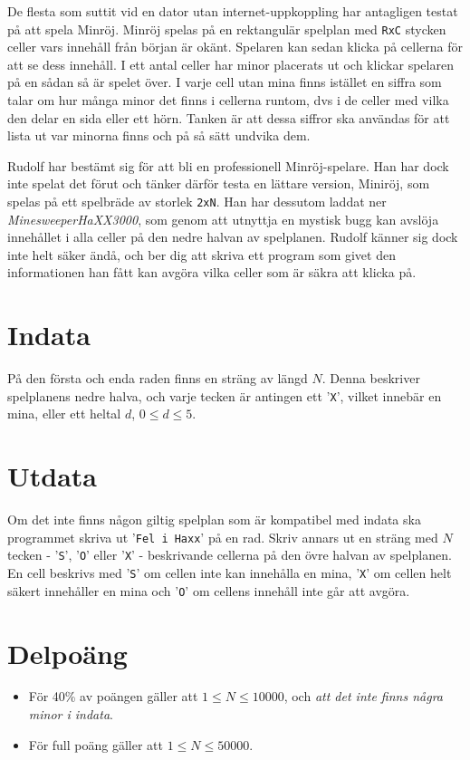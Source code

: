 De flesta som suttit vid en dator utan internet-uppkoppling har antagligen testat på att spela Minröj. Minröj spelas på en rektangulär spelplan med \texttt{RxC} stycken celler vars innehåll från början är okänt. Spelaren kan sedan klicka på cellerna för att se dess innehåll. I ett antal celler har minor placerats ut och klickar spelaren på en sådan så är spelet över. I varje cell utan mina finns istället en siffra som talar om hur många minor det finns i cellerna runtom, dvs i de celler med vilka den delar en sida eller ett hörn. Tanken är att dessa siffror ska användas för att lista ut var minorna finns och på så sätt undvika dem.

Rudolf har bestämt sig för att bli en professionell Minröj-spelare. Han har dock inte spelat det förut och tänker därför testa en lättare version, Miniröj, som spelas på ett spelbräde av storlek \texttt{2xN}. Han har dessutom laddat ner \emph{MinesweeperHaXX3000}, som genom att utnyttja en mystisk bugg kan avslöja innehållet i alla celler på den nedre halvan av spelplanen. Rudolf känner sig dock inte helt säker ändå, och ber dig att skriva ett program som givet den informationen han fått kan avgöra vilka celler som är säkra att klicka på.

\section*{Indata}
På den första och enda raden finns en sträng av längd $N$. Denna beskriver spelplanens nedre halva, och varje tecken är antingen ett '\texttt{X}', vilket innebär en mina, eller ett heltal $d$, $0 \leq d \leq 5$.

\section*{Utdata}
Om det inte finns någon giltig spelplan som är kompatibel med indata ska programmet skriva ut '\texttt{Fel i Haxx}' på en rad. Skriv annars ut en sträng med $N$ tecken - '\texttt{S}', '\texttt{O}' eller '\texttt{X}' - beskrivande cellerna på den övre halvan av spelplanen. En cell beskrivs med '\texttt{S}' om cellen inte kan innehålla en mina, '\texttt{X}' om cellen helt säkert innehåller en mina och '\texttt{O}' om cellens innehåll inte går att avgöra.

\section*{Delpoäng}
\begin{itemize}
\item För 40\% av poängen gäller att $1 \leq N \leq 10 000$, och \emph{att det inte finns några minor i indata}.
\item För full poäng gäller att $1 \leq N \leq 50 000$.
\end{itemize}

